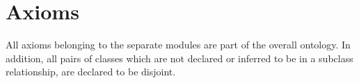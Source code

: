 \section{Axioms}

All axioms belonging to the separate modules are part of the overall ontology. In addition, all pairs of classes which are not declared or inferred to be in a subclass relationship, are declared to be disjoint.




